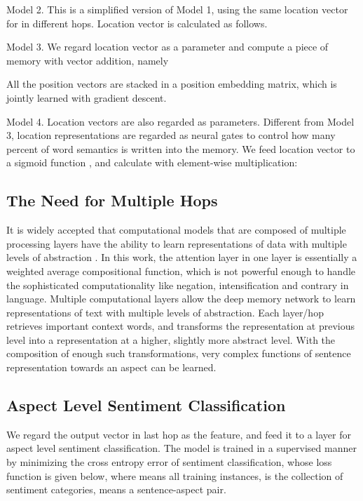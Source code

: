 \documentclass[11pt,letterpaper]{article}
\begin{document}
 {Model 2}. This is a simplified version of Model 1, using the same location vector  for  in different hops.
Location vector  is calculated as follows.


 {Model 3}. We regard location vector  as a parameter and compute a piece of memory with vector addition, namely 


All the position vectors are stacked in a position embedding matrix, which is jointly learned with gradient descent.

 {Model 4}. Location vectors are also regarded as parameters. 
Different from Model 3, location representations are regarded as neural gates to control how many percent of word semantics is written into the memory. We feed location vector  to a sigmoid function , and calculate  with element-wise multiplication: 


\subsection{The Need for Multiple Hops}
It is widely accepted that computational models that are composed of multiple processing layers have the ability to learn representations of data with multiple levels of abstraction \cite{LeCun2015}.
In this work, the attention layer in one layer is essentially a weighted average compositional function, which is not powerful enough to handle the sophisticated computationality like negation, intensification and contrary in language.
Multiple computational layers allow the deep memory network to learn representations of text with multiple levels of abstraction. Each layer/hop retrieves important context words, and transforms the representation at previous level into a representation at a higher, slightly more abstract level. With the composition of enough such transformations, very complex functions of sentence representation towards an aspect can be learned.

\subsection{Aspect Level Sentiment Classification}
We regard the output vector in last hop as the feature, and feed it to a  layer for aspect level sentiment classification. 
The model is trained in a supervised manner by minimizing the cross entropy error of sentiment classification, whose loss function is given below, where  means all training instances,  is the collection of sentiment categories,  means a sentence-aspect pair.
\end{document}
